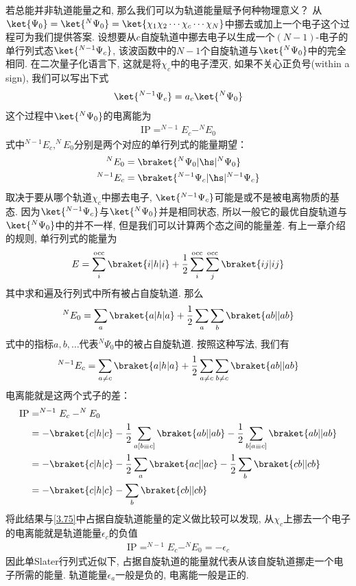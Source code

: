 若总能并非轨道能量之和, 
那么我们可以为轨道能量赋予何种物理意义？
从$\ket{\Psi_0}=\ket{^N\Psi_0}=\ket{\chi_1\chi_2\cdots\chi_c\cdots\chi_N}$中挪去或加上一个电子这个过程可为我们提供答案. 
设想要从$c$自旋轨道中挪去电子以生成一个$(N-1)$-电子的单行列式态$\ket{^{N-1}\Psi_c}$, 
该波函数中的$N-1$个自旋轨道与$\ket{^N\Psi_0}$中的完全相同. 
在二次量子化语言下, 
这就是将$\chi_c$中的电子湮灭, 
如果不关心正负号(within a sign), 
我们可以写出下式
\begin{align}
	\ket{^{N-1}\Psi_c} = a_c\ket{^N\Psi_0}
\end{align}
这个过程中$\ket{^N\Psi_0}$的电离能为
\begin{align}
	\mathrm{IP} = ^{N-1}E_c - ^{N}E_0
\end{align}
式中$^{N-1}E_c,^{N}E_0$分别是两个对应的单行列式的能量期望：
\begin{align}
	^{N}E_0  & = \braket{^N\Psi_0|\hs|^N\Psi_0}\\
	^{N-1}E_c&= \braket{^{N-1}\Psi_c|\hs|^{N-1}\Psi_c}
\end{align}
取决于要从哪个轨道$\chi_c$中挪去电子, 
$\ket{^{N-1}\Psi_c}$可能是或不是被电离物质的基态. 
因为$\ket{^{N-1}\Psi_c}$与$\ket{^N\Psi_0}$并是相同状态, 
所以一般它的最优自旋轨道与$\ket{^N\Psi_0}$中的并不一样, 
但是我们可以计算两个态之间的能量差. 
有上一章介绍的规则, 
单行列式的能量为
\begin{align}
	\label{3.87}
	E = \sum_i^\mathrm{occ} \braket{i|h|i} + \frac{1}{2}\sum^\mathrm{occ}_i\sum^\mathrm{occ}_j\braket{ij|ij}
\end{align}
其中求和遍及行列式中所有被占自旋轨道. 
那么
\begin{align}
	\label{3.88}
	^NE_0 = \sum_a\braket{a|h|a} + \frac{1}{2}\sum_a\sum_b\braket{ab||ab}
\end{align}
式中的指标$a,b,\ldots$代表$^N\Psi_0$中的被占自旋轨道. 
按照这种写法, 
我们有
\begin{align}
	^{N-1}E_c = \sum_{a\neq c}\braket{a|h|a} + \frac{1}{2}\sum_{a\neq c}\sum_{b\neq c}\braket{ab||ab}
\end{align}
电离能就是这两个式子的差：
\begin{align}
	\mathrm{IP} & = ^{N-1}E_c - ^NE_0\notag\\
	& = -\braket{c|h|c} - \frac{1}{2}\sum_{a[b\equiv c]}\braket{ab||ab}- \frac{1}{2}\sum_{b[a\equiv c]}\braket{ab||ab}\notag\\
	& = -\braket{c|h|c} - \frac{1}{2}\sum_{a}\braket{ac||ac}- \frac{1}{2}\sum_{b}\braket{cb||cb}\notag\\
	& = -\braket{c|h|c} - \sum_{b}\braket{cb||cb}
\end{align}
将此结果与\autoref{3.75}中占据自旋轨道能量的定义做比较可以发现, 
从$\chi_c$上挪去一个电子的电离能就是轨道能量$\epsilon_c$的负值
\begin{align}
	\mathrm{IP} = ^{N-1}E_c - ^NE_0 = -\epsilon_c
\end{align}
因此单Slater行列式近似下, 
占据自旋轨道的能量就代表从该自旋轨道挪走一个电子所需的能量. 
轨道能量$\epsilon_a$一般是负的, 
电离能一般是正的.

